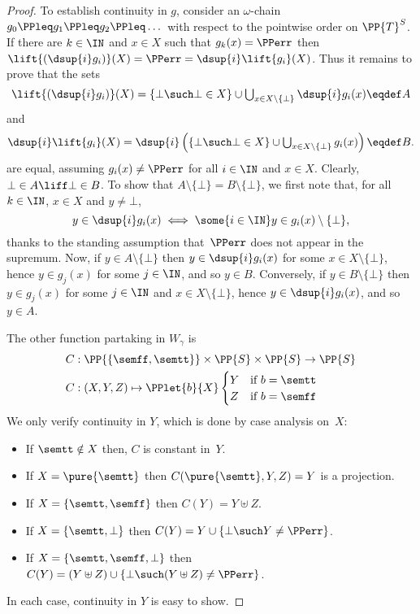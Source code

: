 \begin{proof}
To establish continuity in $g$, consider an $\omega$-chain $g_0 \PPleq g_1 \PPleq g_2 \PPleq \dots$ with respect to the pointwise order on $\PP{T}^S$.
%
If there are $k \in \IN$ and $x \in X$ such that $g_k(x) = \PPerr$ then $\lift{(\dsup{i} g_i)}(X) = \PPerr = \dsup{i} \lift{g_i}(X)$.
Thus it remains to prove that the sets
%
\begin{equation*}
  \textstyle
  \lift{(\dsup{i} g_i)}(X) =
      \{\bot \such \bot \in X\} \cup 
      \bigcup_{x \in X \setminus \{\bot\}} \dsup{i} g_i(x) \eqdef A
\end{equation*}
%
and
%
\begin{equation*}
  \textstyle
  \dsup{i} \lift{g_i}(X) =
  \dsup{i} \left(
      \{\bot \such \bot \in X\} \cup 
      \bigcup_{x \in X \setminus \{\bot\}} g_i(x)
   \right) \eqdef B.
\end{equation*}
%
are equal, assuming $g_i(x) \neq \PPerr$ for all $i \in \IN$ and $x \in X$.
%
Clearly, $\bot \in A \liff \bot \in B$.
%
To show that $A \setminus \{\bot\} = B \setminus \{\bot\}$, we first note that, for all $k \in \IN$, $x \in X$ and $y \neq \bot$,
%
\begin{equation*}
  y \in \dsup{i} g_i(x)
  \iff
  \some{i \in \IN} y \in g_i(x) \setminus \{\bot\},
\end{equation*}
%
thanks to the standing assumption that~$\PPerr$ does not appear in the supremum.
%
Now, if $y \in A \setminus \{\bot\}$ then $y \in \dsup{i} g_i(x)$ for some $x \in X \setminus \{\bot\}$,
hence $y \in g_j(x)$ for some $j \in \IN$, and so $y \in B$.
%
Conversely, if $y \in B \setminus \{\bot\}$ then $y \in g_j(x)$ for some $j \in \IN$ and $x \in X \setminus \{\bot\}$, hence $y \in \dsup{i} g_i(x)$, and so $y \in A$.

The other function partaking in $W_\gamma$ is
\begin{align*}
  C &: \PP{\{\semff, \semtt\}} \times \PP{S} \times \PP{S} \to \PP{S}
  \\
  C &: (X,Y,Z) \mapsto \PPlet{b}{X} 
      \begin{cases} 
        Y & \text{if $b = \semtt$} \\
        Z & \text{if $b = \semff$} 
      \end{cases}
\end{align*}
%
We only verify continuity in $Y$, which is done by case analysis on~$X$:
%
\begin{itemize}
\item If $\semtt \notin X$ then, $C$ is constant in~$Y$.
\item If $X = \pure{\semtt}$ then $C(\pure{\semtt},Y,Z) = Y$ is a projection.
\item If $X = \{\semtt, \semff\}$ then $C(Y) = Y \uplus Z$.
\item If $X = \{\semtt,\bot\}$ then $C(Y) = Y\cup \{\bot \such Y \neq \PPerr\}$.
\item If $X = \{\semtt, \semff,\bot\}$ then  $C(Y) = (Y \uplus Z) \cup \{\bot \such (Y \uplus Z) \neq \PPerr\}$.\end{itemize}
In each case, continuity in $Y$ is easy to show.
\end{proof}

